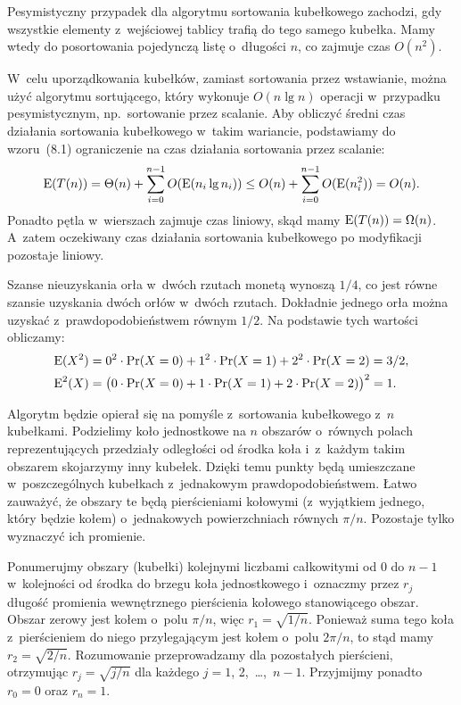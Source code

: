 \exercise %
Pesymistyczny przypadek dla algorytmu sortowania kubełkowego zachodzi, gdy wszystkie elementy z~wejściowej tablicy trafią do tego samego kubełka. Mamy wtedy do posortowania pojedynczą listę o~długości $n$, co zajmuje czas $O(n^2)$.

W~celu uporządkowania kubełków, zamiast sortowania przez wstawianie, można użyć algorytmu sortującego, który wykonuje $O(n\lg n)$ operacji w~przypadku pesymistycznym, np.\ sortowanie przez scalanie. Aby obliczyć średni czas działania sortowania kubełkowego w~takim wariancie, podstawiamy do wzoru~(8.1) ograniczenie na czas działania sortowania przez scalanie:
\[
	\operatorname{E}(T(n)) = \Theta(n)+\sum_{i=0}^{n-1}O(\operatorname{E}(n_i\lg n_i)) \le O(n)+\sum_{i=0}^{n-1}O(\operatorname{E}(n_i^2)) = O(n).
\]
Ponadto pętla  w~wierszach  zajmuje czas liniowy, skąd mamy $\operatorname{E}(T(n))=\Omega(n)$. A~zatem oczekiwany czas działania sortowania kubełkowego po modyfikacji pozostaje liniowy.

\exercise %
Szanse nieuzyskania orła w~dwóch rzutach monetą wynoszą $1/4$, co jest równe szansie uzyskania dwóch orłów w~dwóch rzutach. Dokładnie jednego orła można uzyskać z~prawdopodobieństwem równym $1/2$. Na podstawie tych wartości obliczamy:
\begin{align*}
	\operatorname{E}(X^2) &= 0^2\cdot\Pr(X=0)+1^2\cdot\Pr(X=1)+2^2\cdot\Pr(X=2) = 3/2, \\
	\operatorname{E}^2(X) &= \bigl(0\cdot\Pr(X=0)+1\cdot\Pr(X=1)+2\cdot\Pr(X=2)\bigr)^2 = 1.
\end{align*}

\exercise %
Algorytm będzie opierał się na pomyśle z~sortowania kubełkowego z~$n$ kubełkami. Podzielimy koło jednostkowe na $n$ obszarów o~równych polach reprezentujących przedziały odległości od środka koła i~z~każdym takim obszarem skojarzymy inny kubełek. Dzięki temu punkty będą umieszczane w~poszczególnych kubełkach z~jednakowym prawdopodobieństwem. Łatwo zauważyć, że obszary te będą pierścieniami kołowymi (z~wyjątkiem jednego, który będzie kołem) o~jednakowych powierzchniach równych $\pi/n$. Pozostaje tylko wyznaczyć ich promienie.

Ponumerujmy obszary (kubełki) kolejnymi liczbami całkowitymi od 0 do $n-1$ w~kolejności od środka do brzegu koła jednostkowego i~oznaczmy przez $r_j$ długość promienia wewnętrznego pierścienia kołowego stanowiącego  obszar. Obszar zerowy jest kołem o~polu $\pi/n$, więc $r_1=\sqrt{1/n}$. Ponieważ suma tego koła z~pierścieniem do niego przylegającym jest kołem o~polu $2\pi/n$, to stąd mamy $r_2=\sqrt{2/n}$. Rozumowanie przeprowadzamy dla pozostałych pierścieni, otrzymując $r_j=\sqrt{j/n}$ dla każdego $j=1$, 2,~\dots,~$n-1$. Przyjmijmy ponadto $r_0=0$ oraz $r_n=1$.

